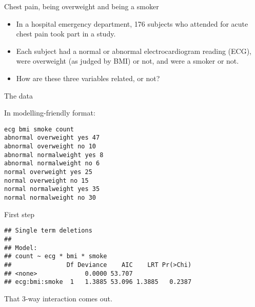 \begin{frame}[fragile]{Chest pain, being overweight and being a smoker}
  
  \begin{itemize}
  \item In a hospital emergency department, 176 subjects who attended
    for acute chest pain took part in a study.
  \item Each subject had a
    normal or abnormal electrocardiogram reading (ECG), were
    overweight (as judged by BMI) or not, and were a smoker or
    not.
  \item How are these three variables related, or not?
  \end{itemize}
  
\end{frame}

\begin{frame}[fragile]{The data}
  
  In modelling-friendly format:
  
\begin{verbatim}
ecg bmi smoke count
abnormal overweight yes 47
abnormal overweight no 10
abnormal normalweight yes 8 
abnormal normalweight no 6
normal overweight yes 25 
normal overweight no 15 
normal normalweight yes 35
normal normalweight no 30
\end{verbatim}
  
\end{frame}

\begin{frame}[fragile]{First step}
  
\begin{knitrout}
\color{fgcolor}\begin{kframe}
\begin{alltt}
\hlkwb{=}\hlstd{(}\hlstd{,}
\hlkwb{=}\hlopt{~}\hlopt{*}\hlopt{*}\hlstd{=}\hlstd{)}
\hlstd{=}\hlstd{)}
\end{alltt}
\begin{verbatim}
## Single term deletions
## 
## Model:
## count ~ ecg * bmi * smoke
##               Df Deviance    AIC    LRT Pr(>Chi)
## <none>             0.0000 53.707                
## ecg:bmi:smoke  1   1.3885 53.096 1.3885   0.2387
\end{verbatim}
\end{kframe}
\end{knitrout}

That 3-way interaction comes out.
  
\end{frame}

